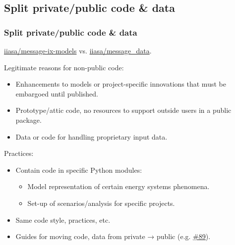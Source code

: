 \documentclass[12pt,aspectratio=169]{beamer}
\begin{document}
\subsection{Split private/public code \& data}

\begin{frame}
\frametitle{Split private/public code \& data}

\href{https://github.com/iiasa/message-ix-models}{\ttfamily iiasa/message-ix-models} vs.
\href{https://github.com/iiasa/message_data}{\ttfamily iiasa/message\_data}.

\medskip
Legitimate reasons for non-public code:
\begin{itemize}
  \item Enhancements to models or project-specific innovations that must be embargoed until published.
  \item Prototype/attic code, no resources to support outside users in a public package.
  \item Data or code for handling proprietary input data.
\end{itemize}

\medskip
Practices:
\begin{itemize}
  \item Contain code in specific Python modules:
    \begin{itemize}
      \item Model representation of certain energy systems phenomena.
      \item Set-up of scenarios/analysis for specific projects.
    \end{itemize}
  \item Same code style, practices, etc.
  \item Guides for moving code, data from private → public (e.g. \href{https://github.com/iiasa/message-ix-models/pull/89}{\#89}).
\end{itemize}

\end{frame}
\end{document}
